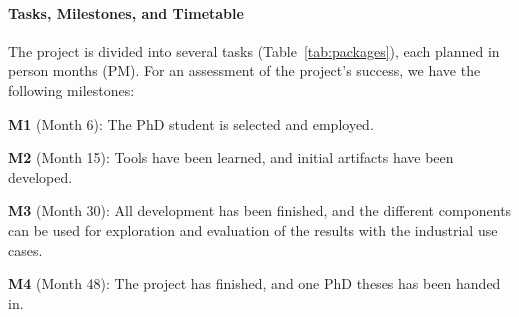 \documentclass[fleqn,12pt]{article}
\begin{document}
\paragraph*{Tasks, Milestones, and Timetable}


%
%
%


The project is divided into several tasks (Table~\ref{tab:packages}), each planned in person months (PM).
For an assessment of the project's success, we have the following milestones:

\textbf{M1} (Month 6): The PhD student is selected and employed.

\textbf{M2} (Month 15): Tools have been learned, and initial artifacts have been developed.

\textbf{M3} (Month 30): All development has been finished, and the different components
can be used for exploration and evaluation of the results with the industrial use cases.

\textbf{M4} (Month 48): The project has finished, and one PhD theses has been handed in.
\end{document}
